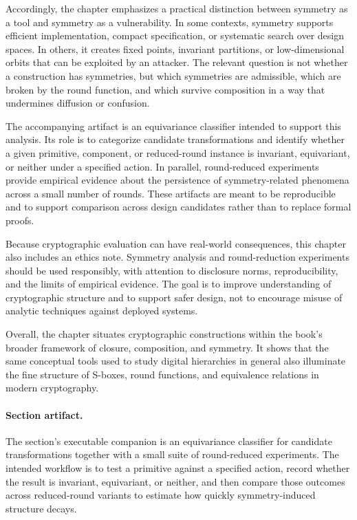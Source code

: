 \documentclass[11pt]{article}
\begin{document}
Accordingly, the chapter emphasizes a practical distinction between symmetry as a tool and symmetry as a vulnerability. In some contexts, symmetry supports efficient implementation, compact specification, or systematic search over design spaces. In others, it creates fixed points, invariant partitions, or low-dimensional orbits that can be exploited by an attacker. The relevant question is not whether a construction has symmetries, but which symmetries are admissible, which are broken by the round function, and which survive composition in a way that undermines diffusion or confusion.

The accompanying artifact is an equivariance classifier intended to support this analysis. Its role is to categorize candidate transformations and identify whether a given primitive, component, or reduced-round instance is invariant, equivariant, or neither under a specified action. In parallel, round-reduced experiments provide empirical evidence about the persistence of symmetry-related phenomena across a small number of rounds. These artifacts are meant to be reproducible and to support comparison across design candidates rather than to replace formal proofs.

Because cryptographic evaluation can have real-world consequences, this chapter also includes an ethics note. Symmetry analysis and round-reduction experiments should be used responsibly, with attention to disclosure norms, reproducibility, and the limits of empirical evidence. The goal is to improve understanding of cryptographic structure and to support safer design, not to encourage misuse of analytic techniques against deployed systems.

Overall, the chapter situates cryptographic constructions within the book's broader framework of closure, composition, and symmetry. It shows that the same conceptual tools used to study digital hierarchies in general also illuminate the fine structure of S-boxes, round functions, and equivalence relations in modern cryptography.

\paragraph{Section artifact.} The section's executable companion is an equivariance classifier for candidate transformations together with a small suite of round-reduced experiments. The intended workflow is to test a primitive against a specified action, record whether the result is invariant, equivariant, or neither, and then compare those outcomes across reduced-round variants to estimate how quickly symmetry-induced structure decays.
\end{document}
